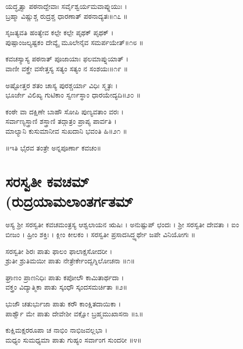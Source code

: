 ಯದ್ಧೃತ್ವಾ ಪಠನಾದ್ದೇವಾಃ ಸರ್ವೈಶ್ವರ್ಯಮವಾಪ್ನುಯುಃ ।\\
ಬ್ರಹ್ಮಾ ವಿಷ್ಣುಶ್ಚ ರುದ್ರಶ್ಚ ಧಾರಣಾತ್ ಪಠನಾದ್ಯತಃ॥೧೭ ॥

ಸೃಜತ್ಯವತಿ ಹಂತ್ಯೇವ ಕಲ್ಪೇ ಕಲ್ಪೇ ಪೃಥಕ್ ಪೃಥಕ್ ।\\
ಪುಷ್ಪಾಂಜಲ್ಯಷ್ಟಕಂ ದೇವ್ಯೈ ಮೂಲೇನೈವ ಸಮರ್ಪಯೇತ್॥೧೮ ॥

ಕವಚಸ್ಯಾಸ್ಯ ಪಠನಾತ್ ಪೂಜಾಯಾಃ ಫಲಮಾಪ್ನುಯಾತ್ ।\\
ವಾಣೀ ವಕ್ತ್ರೇ ವಸೇತ್ತಸ್ಯ ಸತ್ಯಂ ಸತ್ಯಂ ನ ಸಂಶಯಃ॥೧೯ ॥

ಅಷ್ಟೋತ್ತರ ಶತಂ ಚಾಸ್ಯ ಪುರಶ್ಚರ್ಯಾ ವಿಧಿಃ ಸ್ಮೃತಃ ।\\
ಭೂರ್ಜೇ ವಿಲಿಖ್ಯ ಗುಟಿಕಾಂ ಸ್ವರ್ಣಸ್ಥಾಂ ಧಾರಯೇದ್ಯದಿ॥೨೦ ॥

ಕಂಠೇ ವಾ ದಕ್ಷಿಣೇ ಬಾಹೌ ಸೋಪಿ ಪುಣ್ಯವತಾಂ ವರಃ ।\\
ಸರ್ವಾಣ್ಯಸ್ತ್ರಾಣಿ ಶಸ್ತ್ರಾಣಿ ತದ್ಗಾತ್ರಂ ಪ್ರಾಪ್ಯ ಪಾರ್ವತಿ ।\\
ಮಾಲ್ಯಾನಿ ಕುಸುಮಾನೀವ ಸುಖದಾನಿ ಭವಂತಿ ಹಿ॥೨೧ ॥
\begin{center}{\Large॥ಇತಿ ಭೈರವ ತಂತ್ರೇ ಅನ್ನಪೂರ್ಣಾ ಕವಚಂ॥}\end{center}
\newpage
\section{ಸರಸ್ವತೀ ಕವಚಮ್\\ (ರುದ್ರಯಾಮಲಾಂತರ್ಗತಮ್ }

ಅಸ್ಯ ಶ್ರೀ ಸರಸ್ವತೀ ಕವಚಮಂತ್ರಸ್ಯ ಆಶ್ವಲಾಯನ ಋಷಿಃ । ಅನುಷ್ಟುಪ್ ಛಂದಃ । ಶ್ರೀ ಸರಸ್ವತೀ ದೇವತಾ । ಐಂ ಬೀಜಂ । ಹ್ರೀಂ ಶಕ್ತಿಃ । ಕ್ಲೀಂ ಕೀಲಕಂ । ಸರಸ್ವತೀ ಪ್ರಸಾದಸಿದ್ಧ್ಯರ್ಥೇ ಜಪೇ ವಿನಿಯೋಗಃ ॥


ಸರಸ್ವತೀ ಶಿರಃ ಪಾತು ಫಾಲಂ ಫಾಲಾಕ್ಷಸೋದರೀ ।\\
ಶ್ರುತೀ ಶ್ರುತಿಮಯೀ ಪಾತು ನೇತ್ರೇರ್ಕೇಂದ್ವಗ್ನಿಲೋಚನಾ ॥೧॥

ಘ್ರಾಣಂ ಪ್ರಾಣನಿಧಿಃ ಪಾತು ಕಪೋಲೌ ಕಾಮಿತಾರ್ಥದಾ ।\\
ವಕ್ತ್ರಂ ವಿದ್ಯಾತ್ಮಿಕಾ ಪಾತು ಸ್ಕಂಧೌ ಸ್ಕಂದಸಮರ್ಚಿತಾ ॥೨॥

ಭುಜೌ ಚತುರ್ಭುಜಾ ಪಾತು ಕರೌ ಕಾಂಕ್ಷಿತದಾಯಿಕಾ ।\\
ಪಾರ್ಶ್ವೌ ಮೇ ಪಾತು ದೇವೇಶೀ ವಕ್ಷೋ ಬ್ರಹ್ಮಮುಖಾಸನಾ ॥೩॥

ಕುಕ್ಷಿಮಕ್ಷರರೂಪಾ ಚ ನಾಭಿಂ ನಾಭಿಜವಲ್ಲಭಾ ।\\
ಮಧ್ಯಂ ಸುಮಧ್ಯಮಾ ಪಾತು ಗುಹ್ಯಂ ಸರ್ವಾಂಗ ಸುಂದರೀ ॥೪॥


